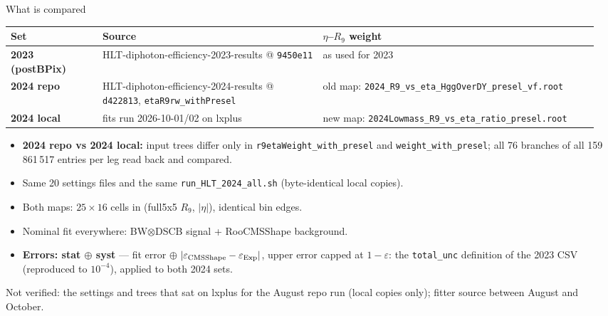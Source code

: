 \documentclass[aspectratio=169,10pt]{beamer}
\newcommand{\RNine}{\ensuremath{R_{9}}}
\newcommand{\gold}[1]{\textcolor{cmsgold}{\textbf{#1}}}
\begin{document}
\begin{frame}{What is compared}
  \centering
  {\scriptsize
  \begin{tabular}{@{}p{0.15\linewidth}p{0.36\linewidth}p{0.45\linewidth}@{}}
    \toprule
    \textbf{Set} & \textbf{Source} & \textbf{$\eta$--\RNine{} weight} \\
    \midrule
    \textcolor{cmsgreen}{\textbf{2023 (postBPix)}} & HLT-diphoton-efficiency-2023-results @ \texttt{9450e11} & as used for 2023 \\
    \textcolor{cmsaccent}{\textbf{2024 repo}} & HLT-diphoton-efficiency-2024-results @ \texttt{d422813}, \texttt{etaR9rw\_withPresel} & old map: \texttt{2024\_R9\_vs\_eta\_HggOverDY\_presel\_vf.root} \\
    \textcolor{red!70!white}{\textbf{2024 local}} & fits run 2026-10-01/02 on lxplus & new map: \texttt{2024Lowmass\_R9\_vs\_eta\_ratio\_presel.root} \\
    \bottomrule
  \end{tabular}}
  \vspace{6pt}
  \begin{itemize}\footnotesize
    \item \gold{2024 repo vs 2024 local:} input trees differ only in \texttt{r9etaWeight\_with\_presel} and \texttt{weight\_with\_presel};
          all 76 branches of all 159\,861\,517 entries per leg read back and compared.
    \item Same 20 settings files and the same \texttt{run\_HLT\_2024\_all.sh} (byte-identical local copies).
    \item Both maps: $25\times16$ cells in (full5x5 \RNine, $|\eta|$), identical bin edges.
    \item Nominal fit everywhere: BW$\otimes$DSCB signal + RooCMSShape background.
    \item \gold{Errors: stat $\oplus$ syst} --- fit error $\oplus$ $|\varepsilon_{\rm CMSShape}-\varepsilon_{\rm Exp}|$, upper error capped at $1-\varepsilon$:
          the \texttt{total\_unc} definition of the 2023 CSV (reproduced to $10^{-4}$), applied to both 2024 sets.
  \end{itemize}
  \vfill
  {\tiny\color{lightgrey} Not verified: the settings and trees that sat on lxplus for the August repo run (local copies only); fitter source between August and October.}
\end{frame}
\end{document}
